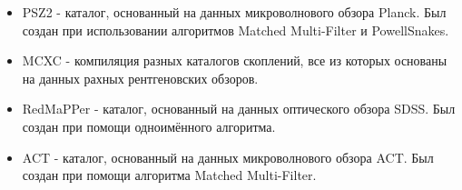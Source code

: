 \begin{itemize}
\item PSZ2 - каталог, основанный на данных микроволнового обзора Planck. Был создан при 
    использовании алгоритмов Matched Multi-Filter и PowellSnakes.\\

\item MCXC - компиляция разных каталогов скоплений, все из которых основаны на данных рахных
    рентгеновских обзоров.\\

\item RedMaPPer - каталог, основанный на данных оптического обзора SDSS. Был создан при помощи 
    одноимённого алгоритма.\\

\item ACT - каталог, основанный на данных микроволнового обзора ACT. Был создан при помощи 
    алгоритма Matched Multi-Filter.\\
\end{itemize}
